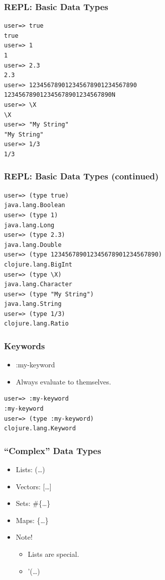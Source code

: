 \documentclass{beamer}
\begin{document}
\begin{frame}[fragile]
\frametitle{REPL: Basic Data Types}
\begin{lstlisting}[basicstyle=\scriptsize]
user=> true
true
user=> 1
1
user=> 2.3
2.3
user=> 123456789012345678901234567890
123456789012345678901234567890N
user=> \X
\X
user=> "My String"
"My String"
user=> 1/3
1/3
\end{lstlisting}
\end{frame}

\begin{frame}[fragile]
\frametitle{REPL: Basic Data Types (continued)}
\begin{lstlisting}[basicstyle=\scriptsize]
user=> (type true)
java.lang.Boolean
user=> (type 1)
java.lang.Long
user=> (type 2.3)
java.lang.Double
user=> (type 123456789012345678901234567890)
clojure.lang.BigInt
user=> (type \X)
java.lang.Character
user=> (type "My String")
java.lang.String
user=> (type 1/3)
clojure.lang.Ratio
\end{lstlisting}
\end{frame}

\begin{frame}[fragile]
\frametitle{Keywords}

\begin{itemize}
\item :my-keyword
\item Always evaluate to themselves.
\end{itemize}
\begin{lstlisting}[basicstyle=\scriptsize]
user=> :my-keyword
:my-keyword
user=> (type :my-keyword)
clojure.lang.Keyword
\end{lstlisting}
\end{frame}

  \begin{frame}
      \frametitle{``Complex'' Data Types}

      \begin{itemize}
          \item Lists: (\ldots)
          \item Vectors: [\ldots]
          \item Sets: \#\{\ldots\}
          \item Maps: \{\ldots\}
          \item Note!
              \begin{itemize}
                  \item Lists are special.
                  \item '(\ldots)
              \end{itemize}
      \end{itemize}
  \end{frame}
\end{document}

